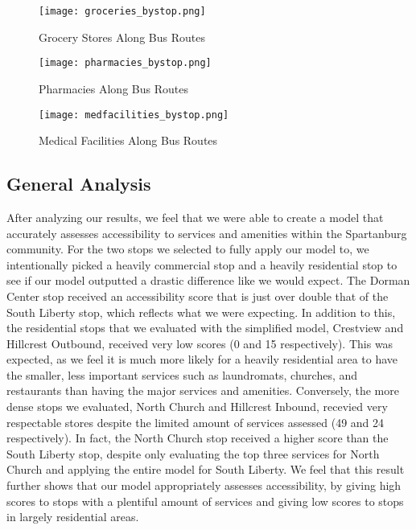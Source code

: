 \begin{figure}
    \centering
    \texttt{[image: groceries\_bystop.png]}
    \caption{Grocery Stores Along Bus Routes}
    \label{fig:enter-label}
\end{figure}
\begin{figure}
    \centering
    \texttt{[image: pharmacies\_bystop.png]}
    \caption{Pharmacies Along Bus Routes}
    \label{fig:enter-label}
\end{figure}
\begin{figure}
    \centering
    \texttt{[image: medfacilities\_bystop.png]}
    \caption{Medical Facilities Along Bus Routes}
    \label{fig:enter-label}
\end{figure}


\subsection{General Analysis}

After analyzing our results, we feel that we were able to create a model that accurately assesses accessibility to services and amenities within the Spartanburg community. For the two stops we selected to fully apply our model to, we intentionally picked a heavily commercial stop and a heavily residential stop to see if our model outputted a drastic difference like we would expect. The Dorman Center stop received an accessibility score that is just over double that of the South Liberty stop, which reflects what we were expecting. In addition to this, the residential stops that we evaluated with the simplified model, Crestview and Hillcrest Outbound, received very low scores (0 and 15 respectively). This was expected, as we feel it is much more likely for a heavily residential area to have the smaller, less important services such as laundromats, churches, and restaurants than having the major services and amenities. Conversely, the more dense stops we evaluated, North Church and Hillcrest Inbound, recevied very respectable stores despite the limited amount of services assessed (49 and 24 respectively). In fact, the North Church stop received a higher score than the South Liberty stop, despite only evaluating the top three services for North Church and applying the entire model for South Liberty. We feel that this result further shows that our model appropriately assesses accessibility, by giving high scores to stops with a plentiful amount of services and giving low scores to stops in largely residential areas.



